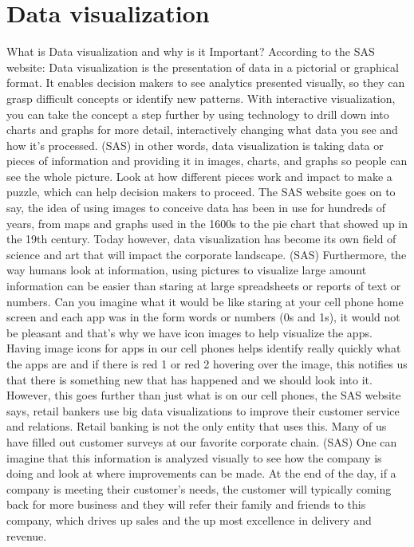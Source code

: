 \documentclass[sigconf]{acmart}
\begin{document}
\section{Data visualization}
What is Data visualization and why is it Important? According to the SAS website:
Data visualization is the presentation of data in a pictorial or graphical format. It enables decision makers to see analytics presented visually, so they can grasp difficult concepts or identify new patterns. With interactive visualization, you can take the concept a step further by using technology to drill down into charts and graphs for more detail, interactively changing what data you see and how it’s processed. (SAS)
in other words, data visualization is taking data or pieces of information and providing it in images, charts, and graphs so people can see the whole picture. Look at how different pieces work and impact to make a puzzle, which can help decision makers to proceed. The SAS website goes on to say, the idea of using images to conceive data has been in use for hundreds of years, from maps and graphs used in the 1600s to the pie chart that showed up in the 19th century. Today however, data visualization has become its own field of science and art that will impact the corporate landscape. (SAS) Furthermore, the way humans look at information, using pictures to visualize large amount information can be easier than staring at large spreadsheets or reports of text or numbers. Can you imagine what it would be like staring at your cell phone home screen and each app was in the form words or numbers (0s and 1s), it would not be pleasant and that’s why we have icon images to help visualize the apps. Having image icons for apps in our cell phones helps identify really quickly what the apps are and if there is red 1 or red 2 hovering over the image, this notifies us that there is something new that has happened and we should look into it. However, this goes further than just what is on our cell phones, the SAS website says, retail bankers use big data visualizations to improve their customer service and relations.  Retail banking is not the only entity that uses this. Many of us have filled out customer surveys at our favorite corporate chain. (SAS) One can imagine that this information is analyzed visually to see how the company is doing and look at where improvements can be made. At the end of the day, if a company is meeting their customer’s needs, the customer will typically coming back for more business and they will refer their family and friends to this company, which drives up sales and the up most excellence in delivery and revenue.
\end{document}
